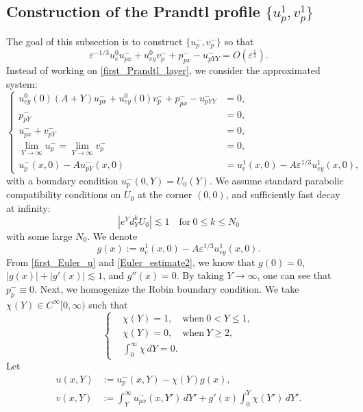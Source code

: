 \documentclass[reqno, 11pt]{amsart}
\theoremstyle{plain}
\theoremstyle{definition}
\theoremstyle{remark}
\numberwithin{equation}{section}
\begin{document}
\subsection{Construction of the Prandtl profile $\{u_p^1, v_p^1\}$} The goal of this subsection is to construct $\{u_p^-, v_p^-\}$ so that
\begin{equation}\label{goal_prandtl}
\varepsilon^{-1/3} u_e^0 u_{px}^- + u_{ey}^0 v_p^- + p_{px}^- - u_{pYY}^- = O(\varepsilon^{\frac{1}{3}}).
\end{equation}
Instead of working on \eqref{first_Prandtl_layer}, we consider the approximated system:
\begin{equation}\label{eqn:approximated_Prandtl}
\left\{\begin{aligned}
 u_{ey}^0(0) (A+Y) u_{px}^- + u_{ey}^0(0) v_p^- + p_{px}^- - u_{pYY}^- &= 0,\\
 p_{pY}^- &= 0,\\
u_{px}^- + v_{pY}^- &= 0,\\
\lim_{Y \to \infty} u_p^- = \lim_{Y \to \infty} v_p^- &= 0,\\
u_p^-(x,0) - A u_{pY}^-(x,0) &= u_e^1(x,0) - A \varepsilon^{1/3} u_{ey}^1(x,0),
\end{aligned}\right.
\end{equation}
with a boundary condition $u_p^-(0,Y) = U_0(Y)$. We assume standard parabolic compatibility conditions on $U_0$ at the corner $(0,0)$, and sufficiently fast decay at infinity:
\begin{equation}\label{first_Prandtl_initialdata}
|e^Y d_Y^k U_0| \lesssim 1 \quad \mbox{for}~0 \le k \le N_0
\end{equation}
with some large $N_0$.  We denote
$$
g(x):= u_e^1(x,0) - A \varepsilon^{1/3} u_{ey}^1(x,0).
$$
From \eqref{first_Euler_u} and \eqref{Euler_estimate2}, we know that $g(0) = 0$, $|g(x)| + |g'(x)| \lesssim 1$, and $g''(x) = 0$. By taking $Y \to \infty$, one can see that $p_p^- \equiv 0$. Next, we homogenize the Robin boundary condition. We take $\chi(Y) \in C^\infty[0,\infty)$ such that
$$
\left\{
\begin{aligned}
& \chi(Y) = 1, \quad \mbox{when}~0<Y\le 1,\\
& \chi(Y) = 0, \quad \mbox{when}~Y \ge 2,\\
& \int_0^\infty \chi \, dY = 0.
\end{aligned}
\right.
$$
Let
\begin{align*}
u(x,Y)&:= u_p^- (x,Y) - \chi(Y)g(x),\\
v(x,Y)&:= \int_Y^\infty u_{px}^-(x,Y') \, dY' + g'(x) \int_0^Y \chi(Y') \, dY'.
\end{align*}
\end{document}
